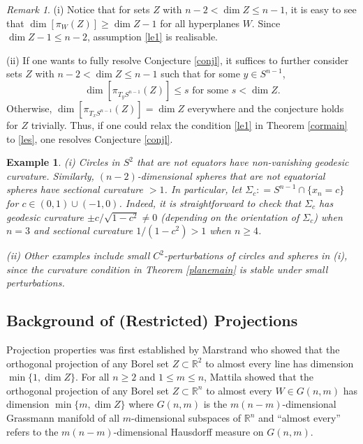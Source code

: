 \documentclass[11pt,a4paper,reqno]{amsart}
\newcommand{\R}{\mathbb{R}}
\newcommand{\1}{\mathbf{1}}
\numberwithin{equation}{section}
\theoremstyle{plain}
\newtheorem{ex}[equation]{Example}
\theoremstyle{definition}
\theoremstyle{remark}
\newtheorem{remark}[equation]{Remark}
\begin{document}
\begin{remark} \label{rmkmain}
  \rm
(i) Notice that for sets $Z$ with $n-2<\dim Z \le n-1$, it is easy to see that $\dim[\pi_{W}(Z)] \ge \dim Z-1$ for all hyperplanes $W$. Since $\dim Z-1 \le n-2$, assumption \eqref{le1} is realisable.

  (ii) If one wants to fully resolve Conjecture \ref{conjl}, it suffices to further consider sets $Z$ with $n-2<\dim Z \le n-1$ such that for some $y \in S^{n-1}$,
     \begin{equation}\label{les}
     \dim[\pi_{T_{y}S^{n-1}}(Z)] \le s \mbox{ for some $s < \dim Z$}.
   \end{equation}
   Otherwise, $\dim[\pi_{T_{x}S^{n-1}}(Z)] =\dim Z$ everywhere and the conjecture holds for $Z$ trivially.
   Thus, if one could relax the condition \eqref{le1} in Theorem \ref{cormain} to \eqref{les}, one resolves Conjecture \ref{conjl}.
\end{remark}


\begin{ex} \label{eg1}
   \rm
   (i) Circles in $S^2$ that are not equators have non-vanishing geodesic curvature. Similarly, $(n-2)$-dimensional spheres that are not equatorial spheres have sectional curvature $>1$.
   In particular, let $\Sigma_c: = S^{n-1} \cap \{x_{n}=c\}$ for $c \in (0,1)\cup(-1,0)$. Indeed, it is straightforward to check that $\Sigma_c$ has geodesic curvature $\pm c/\sqrt{1-c^2} \ne 0$ (depending on the orientation of $\Sigma_c$) when $n=3$ and
   sectional curvature $1/(1-c^2) >1$ when $n \ge 4$.


   (ii) Other examples include small $C^2$-perturbations of circles and spheres in (i), since the curvature condition in Theorem \ref{planemain} is stable under small perturbations.
\end{ex}












\subsection{Background of (Restricted) Projections}
Projection properties was first established by Marstrand \cite{MR0063439} who showed that the orthogonal projection of any Borel set $Z \subset \R^2$ to almost every line has dimension $\min\{1, \dim Z\}$. For all $n \ge 2$ and $1 \le m \le n$, Mattila \cite{MR0409774} showed that the orthogonal projection of any Borel set $Z \subset \R^n$ to almost every $W \in G(n,m)$ has dimension $\min\{m, \dim Z\}$ where $G(n,m)$ is the $m(n-m)$-dimensional Grassmann manifold of all
$m$-dimensional subspaces of $\R^n$ and ``almost every'' refers to the $m(n-m)$-dimensional Hausdorff measure on $G(n,m)$.
\end{document}
